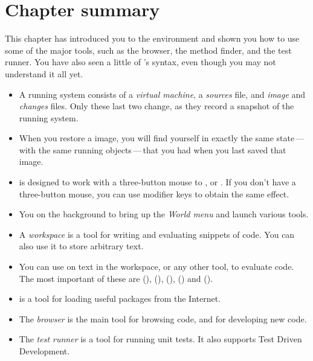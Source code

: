 \documentclass[a4paper,10pt,twoside]{book}
\begin{document}
\section{Chapter summary}
This chapter has introduced you to the \pharo environment and shown you how to use some of the major tools, such as the browser, the method finder, and the test runner.   You have also seen a little of \pharo's syntax, even though you may not understand it all yet.

\begin{itemize}
  \item A running \pharo system consists of a \emph{virtual machine}, a \emph{sources} file, and \emph{image} and \emph{changes} files. Only these last two change, as they record a snapshot of the running system.
  \item When you restore a \pharo image, you will find yourself in exactly the same state\,---\,with the same running objects\,---\,that you had when you last saved that image.
  \item \pharo is designed to work with a three-button mouse to \click, \actclick or \metaclick.  If you don't have a three-button mouse, you can use modifier keys to obtain the same effect.
  \item You \click on the \pharo background to bring up the \emph{World menu} and launch various tools.
  \item A \emph{workspace} is a tool for writing and evaluating snippets of code. You can also use it to store arbitrary text.
  \item You can use  on text in the workspace, or any other tool, to evaluate code. The most important of these are  (),  (),  (),  () and  ().
  \item \sqmap is a tool for loading useful packages from the Internet.
  \item The \emph{browser} is the main tool for browsing \pharo code, and for developing new code.
  \item The \emph{test runner} is a tool for running unit tests. It also supports Test Driven Development.
\end{itemize}

\ifx\wholebook\relax\else 
   
   
\end{document}
